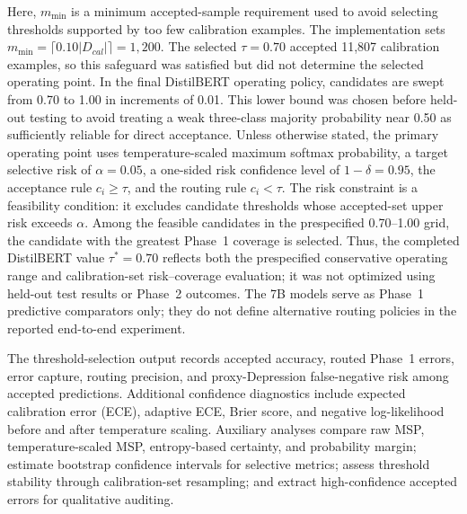\documentclass{ieeeaccess}
\begin{document}
Here, $m_{\min}$ is a minimum accepted-sample requirement used to avoid selecting thresholds supported by too few calibration examples. The implementation sets $m_{\min}=\lceil0.10|D_{cal}|\rceil=1{,}200$. The selected $\tau=0.70$ accepted 11,807 calibration examples, so this safeguard was satisfied but did not determine the selected operating point. In the final DistilBERT operating policy, candidates are swept from 0.70 to 1.00 in increments of 0.01. This lower bound was chosen before held-out testing to avoid treating a weak three-class majority probability near 0.50 as sufficiently reliable for direct acceptance. Unless otherwise stated, the primary operating point uses temperature-scaled maximum softmax probability, a target selective risk of $\alpha=0.05$, a one-sided risk confidence level of $1-\delta=0.95$, the acceptance rule $c_i \geq \tau$, and the routing rule $c_i < \tau$. The risk constraint is a feasibility condition: it excludes candidate thresholds whose accepted-set upper risk exceeds $\alpha$. Among the feasible candidates in the prespecified 0.70--1.00 grid, the candidate with the greatest Phase~1 coverage is selected. Thus, the completed DistilBERT value $\tau^*=0.70$ reflects both the prespecified conservative operating range and calibration-set risk--coverage evaluation; it was not optimized using held-out test results or Phase~2 outcomes. The 7B models serve as Phase~1 predictive comparators only; they do not define alternative routing policies in the reported end-to-end experiment.

The threshold-selection output records accepted accuracy, routed Phase~1 errors, error capture, routing precision, and proxy-Depression false-negative risk among accepted predictions. Additional confidence diagnostics include expected calibration error (ECE), adaptive ECE, Brier score, and negative log-likelihood before and after temperature scaling. Auxiliary analyses compare raw MSP, temperature-scaled MSP, entropy-based certainty, and probability margin; estimate bootstrap confidence intervals for selective metrics; assess threshold stability through calibration-set resampling; and extract high-confidence accepted errors for qualitative auditing.
\end{document}
